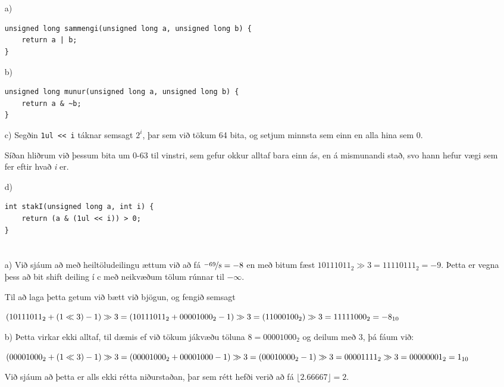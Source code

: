 \documentclass{article}
\begin{document}
	\section{}

	\begin{itemize}
		\item[a)] \begin{Verbatim}[fontfamily=courier]
unsigned long sammengi(unsigned long a, unsigned long b) {
	return a | b;
}
			\end{Verbatim}
		\item[b)] \begin{Verbatim}[fontfamily=courier]
unsigned long munur(unsigned long a, unsigned long b) {
	return a & ~b;
}
			\end{Verbatim}
		\item[c)] 
			Segðin \texttt{1ul <{}< i} táknar semsagt $2^i$, þar sem við 
			tökum 64 bita, og setjum minnsta sem einn en alla hina sem 0.

			Síðan hliðrum við þessum bita um 0-63 til vinstri, sem gefur 
			okkur alltaf bara einn ás, en á mismunandi stað, svo hann 
			hefur vægi sem fer eftir hvað \textit{i} er.
		\item[d)] \begin{Verbatim}[fontfamily=courier]
int stakI(unsigned long a, int i) {
	return (a & (1ul << i)) > 0;
}
			\end{Verbatim}
	\end{itemize}

	\section{}

	\begin{itemize}
		\item[a)] Við sjáum að með heiltöludeilingu ættum við að fá 
			$\nicefrac{-69}{8} = -8$ en með bitum fæst $10111011_2 \gg 3 = 
			11110111_2 = -9$. Þetta er vegna þess að bit shift deiling í 
			c með neikvæðum tölum rúnnar til $-\infty$.

			Til að laga þetta getum við bætt við bjögun, og fengið semsagt 

			$(10111011_2 + (1 \ll 3) -1) \gg 3 = 
			(10111011_2 + 00001000_2 - 1) \gg 3 \\ = (11000100_2) \gg 3 = 
			11111000_2 = -8_{10}$ 
		\item[b)] Þetta virkar ekki alltaf, til dæmis ef við tökum 
			jákvæðu töluna $8 = 00001000_2$ og deilum með $3$, þá fáum við:

			$(00001000_2 + (1\ll3)-1) \gg 3 \\
			= (00001000_2 + 00001000 - 1) \gg 3 \\
			= (00010000_2 - 1) \gg 3 \\
			= 00001111_2 \gg 3 \\
			= 00000001_2 = 1_{10}$

			Við sjáum að þetta er alls ekki rétta niðurstaðan, þar sem 
			rétt hefði verið að fá $\lfloor 2.66667\rfloor = 2$.
	\end{itemize}
\end{document}
